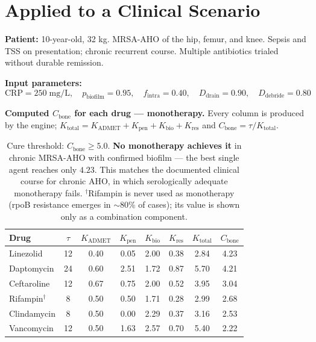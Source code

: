 \documentclass[11pt]{article}
\begin{document}
\section{Applied to a Clinical Scenario}

\textbf{Patient:} 10-year-old, 32 kg. MRSA-AHO of the hip, femur, and knee.
Sepsis and TSS on presentation; chronic recurrent course. Multiple antibiotics
trialed without durable remission.

\textbf{Input parameters:}
\[
  \text{CRP} = 250 \;\text{mg/L}, \quad
  p_{\text{biofilm}} = 0.95, \quad
  f_{\text{intra}} = 0.40, \quad
  D_{\text{drain}} = 0.90, \quad
  D_{\text{debride}} = 0.80
\]

\textbf{Computed $C_{\text{bone}}$ for each drug — monotherapy.} Every column is
produced by the engine; $K_{\text{total}} = K_{\text{ADMET}} + K_{\text{pen}} +
K_{\text{bio}} + K_{\text{res}}$ and $C_{\text{bone}} = \tau / K_{\text{total}}$.

\begin{table}[h!]
\centering
\small
\begin{tabular}{lccccccc}
\toprule
\textbf{Drug} & \textbf{$\tau$} & \textbf{$K_{\text{ADMET}}$} & \textbf{$K_{\text{pen}}$} & \textbf{$K_{\text{bio}}$} & \textbf{$K_{\text{res}}$} & \textbf{$K_{\text{total}}$} & \textbf{$C_{\text{bone}}$} \\
\midrule
Linezolid    & 12 & 0.40 & 0.05 & 2.00 & 0.38 & 2.84 & 4.23 \\
Daptomycin   & 24 & 0.60 & 2.51 & 1.72 & 0.87 & 5.70 & 4.21 \\
Ceftaroline  & 12 & 0.67 & 0.75 & 2.00 & 0.52 & 3.95 & 3.04 \\
Rifampin$^\dagger$ &  8 & 0.50 & 0.50 & 1.71 & 0.28 & 2.99 & 2.68 \\
Clindamycin  &  8 & 0.50 & 0.00 & 2.29 & 0.37 & 3.16 & 2.53 \\
Vancomycin   & 12 & 0.50 & 1.63 & 2.57 & 0.70 & 5.40 & 2.22 \\
\bottomrule
\end{tabular}
\caption{Cure threshold: $C_{\text{bone}} \geq 5.0$. \textbf{No monotherapy
achieves it} in chronic MRSA-AHO with confirmed biofilm — the best single agent
reaches only $4.23$. This matches the documented clinical course for chronic AHO,
in which serologically adequate monotherapy fails. $^\dagger$Rifampin is never
used as monotherapy (rpoB resistance emerges in $\sim$80\% of cases); its value
is shown only as a combination component.}
\end{table}
\end{document}
